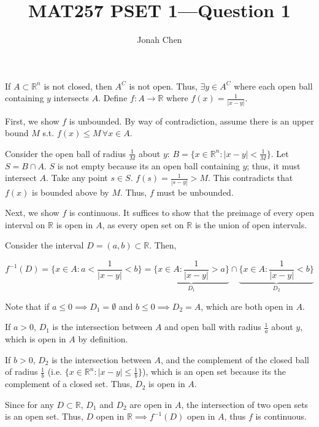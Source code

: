 \documentclass{exam}
\title{MAT257 PSET 1---Question 1}
\author{Jonah Chen}
\numberwithin{equation}{section}
\newcommand{\R}{\mathbb{R}}
\begin{document}
    \sffamily
    If $A\subset\R^n$ is not closed, then $A^C$ is not open. Thus, $\exists y\in A^C$ where each open ball containing $y$ intersects $A$. Define $f:A\to\R$ where $f(x)=\frac{1}{|x-y|}$. 

    First, we show $f$ is unbounded. By way of contradiction, assume there is an upper bound $M$ s.t. $f(x)\leq M\,\forall x\in A$.
    
    Consider the open ball of radius $\frac{1}{M}$ about $y$: $B=\{x\in\R^n:|x-y|<\frac{1}{M}\}$. Let $S=B\cap A$. $S$ is not empty because its an open ball containing $y$; thus, it must intersect $A$. Take any point $s\in S$. $f(s)=\frac{1}{|s-y|}>M$. This contradicts that $f(x)$ is bounded above by $M$. Thus, $f$ must be unbounded. 
    
    Next, we show $f$ is continuous. It suffices to show that the preimage of every open interval on $\R$ is open in $A$, as every open set on $\R$ is the union of open intervals.

    Consider the interval $D=(a,b)\subset\R$. Then,
    
    $$f^{-1}(D)=\{x\in A:a<\frac{1}{|x-y|}<b\}=\underbrace{\{x\in A:\frac{1}{|x-y|}>a\}}_{D_1}\cap\underbrace{\{x\in A:\frac{1}{|x-y|}<b\}}_{D_2}$$

    Note that if $a\leq 0\implies D_1=\emptyset$ and $b\leq 0\implies D_2=A$, which are both open in $A$.

    If $a>0$, $D_1$ is the intersection between $A$ and open ball with radius $\frac{1}{a}$ about $y$, which is open in $A$ by definition.

    If $b>0$, $D_2$ is the intersection between $A$, and the complement of the closed ball of radius $\frac{1}{b}$ (i.e. $\{x\in\R^n:|x-y|\leq\frac{1}{b}\}$), which is an open set because its the complement of a closed set. Thus, $D_2$ is open in $A$. 

    Since for any $D\subset\R$, $D_1$ and $D_2$ are open in $A$, the intersection of two open sets is an open set. Thus, $D$ open in $\R\implies f^{-1}(D)$ open in $A$, thus $f$ is continuous.
\end{document}
